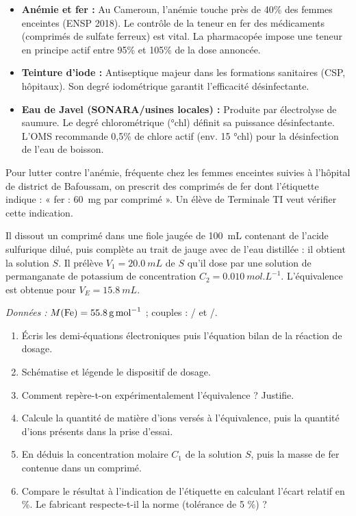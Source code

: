\documentclass[11pt]{article}
\begin{document}
\begin{savaistu}
\begin{itemize}
\item \textbf{Anémie et fer :} Au Cameroun, l'anémie touche près de 40\% des femmes enceintes (ENSP 2018). Le contrôle de la teneur en fer des médicaments (comprimés de sulfate ferreux) est vital. La pharmacopée impose une teneur en principe actif entre 95\% et 105\% de la dose annoncée.
\item \textbf{Teinture d'iode :} Antiseptique majeur dans les formations sanitaires (CSP, hôpitaux). Son degré iodométrique garantit l'efficacité désinfectante.
\item \textbf{Eau de Javel (SONARA/usines locales) :} Produite par électrolyse de saumure. Le degré chlorométrique (°chl) définit sa puissance désinfectante. L'OMS recommande 0,5\% de chlore actif (env. 15 °chl) pour la désinfection de l'eau de boisson.
\end{itemize}
\end{savaistu}

\begin{exercice}
Pour lutter contre l'anémie, fréquente chez les femmes enceintes suivies à l'hôpital de district de Bafoussam, on prescrit des comprimés de fer dont l'étiquette indique : « fer : \SI{60}{mg} par comprimé ». Un élève de Terminale TI veut vérifier cette indication.

Il dissout un comprimé dans une fiole jaugée de \SI{100}{mL} contenant de l'acide sulfurique dilué, puis complète au trait de jauge avec de l'eau distillée : il obtient la solution $S$. Il prélève $V_1 = \SI{20,0}{mL}$ de $S$ qu'il dose par une solution de permanganate de potassium de concentration $C_2 = \SI{0,010}{mol.L^{-1}}$. L'équivalence est obtenue pour $V_E = \SI{15,8}{mL}$.

\emph{Données :} $M(\ce{Fe}) = \SI{55,8}{g.mol^{-1}}$ ; couples : / et /.

\begin{enumerate}
\item Écris les demi-équations électroniques puis l'équation bilan de la réaction de dosage.
\item Schématise et légende le dispositif de dosage.
\item Comment repère-t-on expérimentalement l'équivalence ? Justifie.
\item Calcule la quantité de matière d'ions  versés à l'équivalence, puis la quantité d'ions  présents dans la prise d'essai.
\item En déduis la concentration molaire $C_1$ de la solution $S$, puis la masse de fer contenue dans un comprimé.
\item Compare le résultat à l'indication de l'étiquette en calculant l'écart relatif en \%. Le fabricant respecte-t-il la norme (tolérance de 5 \%) ?
\end{enumerate}
\end{exercice}
\end{document}
